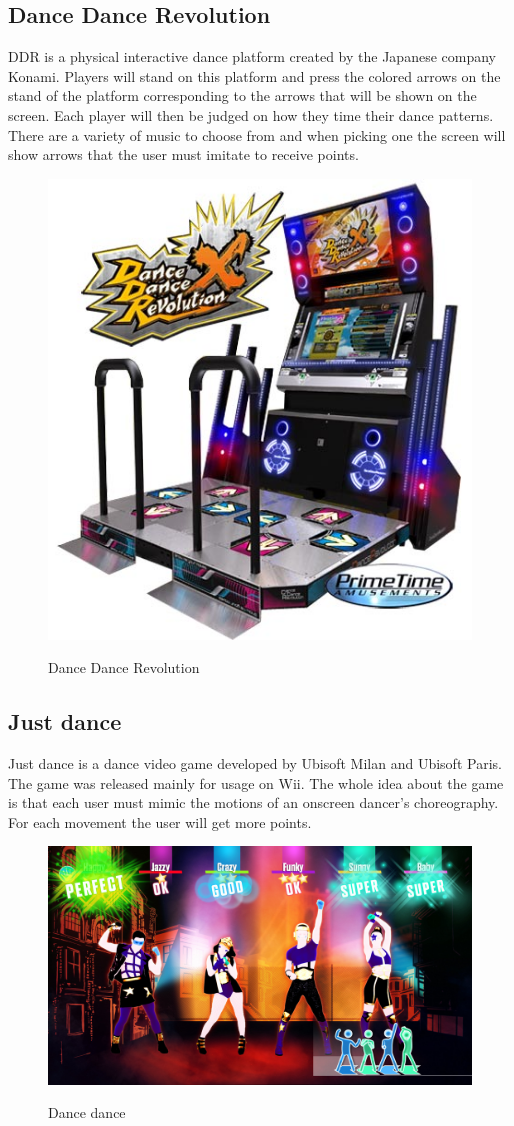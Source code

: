 \subsection{Dance Dance Revolution}
DDR is a physical interactive dance platform created by the Japanese company Konami. Players will stand on this platform and press the colored arrows on the stand of the platform corresponding to the arrows that will be shown on the screen. Each player will then be judged on how they time their dance patterns. There are a variety of music to choose from and when picking one the screen will show arrows that the user must imitate to receive points. 
\begin{figure}[H]
	\centering
	\includegraphics[width=0.7\linewidth]{figure/Analysis/dancedance}
	\label{fig:dancedance}
	\caption{Dance Dance Revolution}
\end{figure}

\subsection{Just dance}
Just dance is a dance video game developed by Ubisoft Milan and Ubisoft Paris. The game was released mainly for usage on Wii. The whole idea about the game is that each user must mimic the motions of an onscreen dancer’s choreography. For each movement the user will get more points. 
\begin{figure}[H]
	\centering
	\includegraphics[width=0.7\linewidth]{figure/Analysis/justdance}
	\label{fig:Just Dance}
	\caption{Dance dance}
\end{figure}



